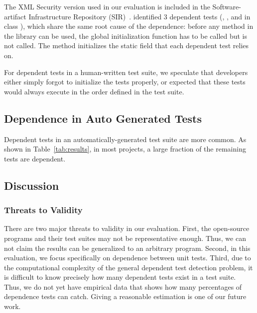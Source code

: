 The XML Security version used in our evaluation is included
in the Soft\-ware-artifact
Infrastructure Repository (SIR)~\cite{sir}. \ourtool identified
3 dependent tests (, , and 
in class ), which share the same root
cause of the dependence: before any
method in the library can be used, the global initialization function 
 has to be called but is not called. The
 method initializes the static field that
each dependent test relies on.

For dependent tests in a human-written test suite, we speculate that
developers either simply forgot to
initialize the tests properly, or expected that these tests would always execute
in the order defined
in the test suite.



\subsection{Dependence in Auto Generated Tests}
\label{sec:autotest}

Dependent tests in an automatically-generated test suite
are more common.  As shown in Table~\ref{tab:results}, in most
projects, a large fraction of the remaining tests are dependent.




\subsection{Discussion}

\subsubsection{Threats to Validity}

There are two major threats to validity in our evaluation.
First, the  open-source
programs and their test suites may not be
representative enough. Thus, we can not claim the results
can be generalized to an arbitrary program.
Second, in this evaluation, we focus specifically on
dependence between unit tests.
Third, due to the computational complexity of the general dependent test
detection problem, it is difficult to know precisely how many dependent
tests exist in a test suite. Thus, we do not
yet have empirical data that shows how many percentages of dependence tests
\ourtool can catch.  Giving a reasonable estimation is one of our future work.

